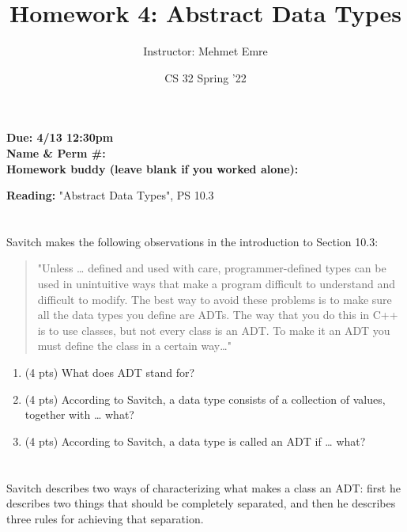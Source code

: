\documentclass[11pt]{article}
\author{Instructor: Mehmet Emre}
\date{CS 32 Spring '22}
\title{Homework 4: Abstract Data Types}
\begin{document}
\maketitle
\textbf{Due: 4/13 12:30pm} \\ 
\vspace{1em}
\textbf{Name \& Perm \#:} \\ 
\textbf{Homework buddy (leave blank if you worked alone):}

\vspace{1em}
\textbf{Reading:} "Abstract Data Types", PS 10.3


\section{}
\label{sec:orgf0d6776}

Savitch makes the following observations in the introduction to
Section 10.3:


\begin{quote}
"Unless \ldots{} defined and used with care, programmer-defined types can be
used in unintuitive ways that make a program difficult to understand and
difficult to modify. The best way to avoid these problems is to make
sure all the data types you define are ADTs. The way that you do this in
C++ is to use classes, but not every class is an ADT. To make it an ADT
you must define the class in a certain way\ldots{}"
\end{quote}

\begin{enumerate}
\item (4 pts) What does ADT stand for?
\vspace{4em}
\item (4 pts) According to Savitch, a data type consists of a collection
of values, together with \ldots{} what?
\vspace{4em}
\item (4 pts) According to Savitch, a data type is called an ADT if
\ldots{} what?
\vspace{4em}
\end{enumerate}

\section{}
\label{sec:orge0ca3b4}

Savitch describes two ways of characterizing what makes a class an ADT:
first he describes two things that should be completely separated, and
then he describes three rules for achieving that separation.
\end{document}
